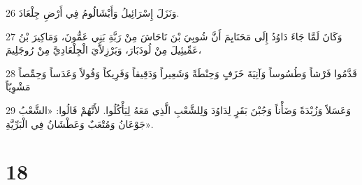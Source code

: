 \par 26 وَنَزَلَ إِسْرَائِيلُ وَأَبْشَالُومُ فِي أَرْضِ جِلْعَادَ.
\par 27 وَكَانَ لَمَّا جَاءَ دَاوُدُ إِلَى مَحَنَايِمَ أَنَّ شُوبِيَ بْنَ نَاحَاشَ مِنْ رَبَّةِ بَنِي عَمُّونَ، وَمَاكِيرَ بْنُ عَمِّيئِيلَ مِنْ لُودَبَارَ، وَبَرْزِلاَّيَ الْجِلْعَادِيَّ مِنْ رُوجَلِيمَ،
\par 28 قَدَّمُوا فَرْشاً وَطُسُوساً وَآنِيَةَ خَزَفٍ وَحِنْطَةً وَشَعِيراً وَدَقِيقاً وَفَرِيكاً وَفُولاً وَعَدَساً وَحِمِّصاً مَشْوِيّاً
\par 29 وَعَسَلاً وَزُبْدَةً وَضَأْناً وَجُبْنَ بَقَرٍ لِدَاوُدَ وَلِلشَّعْبِ الَّذِي مَعَهُ لِيَأْكُلُوا. لأَنَّهُمْ قَالُوا: «الشَّعْبُ جَوْعَانُ وَمُتْعَبٌ وَعَطْشَانُ فِي الْبَرِّيَّةِ».

\chapter{18}

